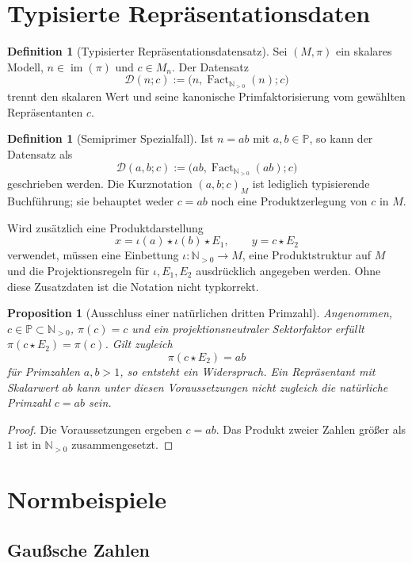 \documentclass[11pt,a4paper,reqno]{amsart}
\newtheorem{proposition}[theorem]{Proposition}
\theoremstyle{definition}
\newtheorem{definition}[theorem]{Definition}
\theoremstyle{remark}
\newcommand{\Npos}{\mathbb{N}_{>0}}
\newcommand{\Pset}{\mathbb{P}}
\newcommand{\Fact}{\operatorname{Fact}}
\newcommand{\im}{\operatorname{im}}
\begin{document}
\section{Typisierte Repräsentationsdaten}

\begin{definition}[Typisierter Repräsentationsdatensatz]
Sei $(M,\pi)$ ein skalares Modell, $n\in\im(\pi)$ und $c\in M_n$. Der Datensatz
\[
  \mathcal D(n;c)
  :=\bigl(n,\Fact_{\Npos}(n);c\bigr)
\]
trennt den skalaren Wert und seine kanonische Primfaktorisierung vom gewählten Repräsentanten $c$.
\end{definition}

\begin{definition}[Semiprimer Spezialfall]
Ist $n=ab$ mit $a,b\in\Pset$, so kann der Datensatz als
\[
  \mathcal D(a,b;c)
  :=\bigl(ab,\Fact_{\Npos}(ab);c\bigr)
\]
geschrieben werden. Die Kurznotation $(a,b;c)_M$ ist lediglich typisierende Buchführung; sie behauptet weder $c=ab$ noch eine Produktzerlegung von $c$ in $M$.
\end{definition}

Wird zusätzlich eine Produktdarstellung
\[
  x=\iota(a)\star\iota(b)\star E_1,
  \qquad y=c\star E_2
\]
verwendet, müssen eine Einbettung $\iota\colon\Npos\to M$, eine Produktstruktur auf $M$ und die Projektionsregeln für $\iota,E_1,E_2$ ausdrücklich angegeben werden. Ohne diese Zusatzdaten ist die Notation nicht typkorrekt.

\begin{proposition}[Ausschluss einer natürlichen dritten Primzahl]
Angenommen, $c\in\Pset\subset\Npos$, $\pi(c)=c$ und ein projektionsneutraler Sektorfaktor erfüllt $\pi(c\star E_2)=\pi(c)$. Gilt zugleich
\[
  \pi(c\star E_2)=ab
\]
für Primzahlen $a,b>1$, so entsteht ein Widerspruch. Ein Repräsentant mit Skalarwert $ab$ kann unter diesen Voraussetzungen nicht zugleich die natürliche Primzahl $c=ab$ sein.
\end{proposition}

\begin{proof}
Die Voraussetzungen ergeben $c=ab$. Das Produkt zweier Zahlen größer als $1$ ist in $\Npos$ zusammengesetzt.
\end{proof}

\section{Normbeispiele}

\subsection{Gaußsche Zahlen}
\label{sec:gauss}
\end{document}
